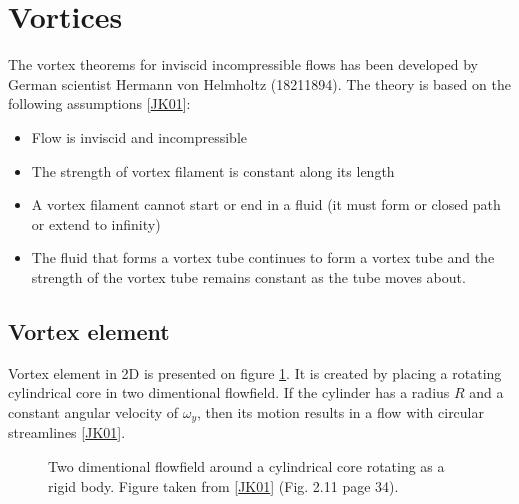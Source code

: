 \documentclass[letterpaper,10pt,english]{jupyterBook}
\begin{document}
\section{Vortices}
\label{\detokenize{chapters/description/theory:vortices}}
\sphinxAtStartPar
The vortex theorems for inviscid incompressible flows has been developed by German scientist Hermann von Helmholtz (1821\sphinxhyphen{}1894). The theory is based on the following assumptions {[}\hyperlink{cite.chapters/bibliography:id3}{JK01}{]}:
\begin{itemize}
\item {} 
\sphinxAtStartPar
Flow is inviscid and incompressible

\item {} 
\sphinxAtStartPar
The strength of vortex filament is constant along its length

\item {} 
\sphinxAtStartPar
A vortex filament cannot start or end in a fluid (it must form or closed path or extend to infinity)

\item {} 
\sphinxAtStartPar
The fluid that forms a vortex tube continues to form a vortex tube and the strength of the vortex tube remains constant as the tube moves about.

\end{itemize}


\subsection{Vortex element}
\label{\detokenize{chapters/description/theory:vortex-element}}
\sphinxAtStartPar
Vortex element in 2D is presented on figure \hyperref[\detokenize{chapters/description/theory:vortex}]{\ref{\detokenize{chapters/description/theory:vortex}}}. It is created by placing a rotating cylindrical core in two dimentional flowfield. If the cylinder has a radius \(R\) and a constant angular velocity of \(\omega_y\), then its motion results in a flow with circular streamlines {[}\hyperlink{cite.chapters/bibliography:id3}{JK01}{]}.

\begin{figure}[htbp]
\centering
\capstart

\noindent{}
\caption{Two dimentional flowfield around a cylindrical core rotating as a rigid body. Figure taken from {[}\hyperlink{cite.chapters/bibliography:id3}{JK01}{]} (Fig. 2.11 page 34).}\label{\detokenize{chapters/description/theory:vortex}}\end{figure}
\end{document}
